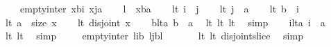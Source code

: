 \begin{isabellebody}
\ \ \ \ empty{\isacharunderscore}inter\ {\isacharparenleft}x{\isasymdagger}b{\isachardot}{\isachardot}i{\isacharparenright}\ {\isacharparenleft}x{\isasymdagger}j{\isachardot}{\isachardot}a{\isacharparenright}{\isachardoublequoteclose}\isanewline
%
\isadelimproof
%
\endisadelimproof
%
\isatagproof
{}\isamarkupfalse%
{\isacharminus}\isanewline
\ \ \isamarkupfalse%
\ {\isacharquery}l\ {\isacharequal}\ {\isachardoublequoteopen}x{\isasymdagger}b{\isachardot}{\isachardot}a{\isachardoublequoteclose}\isanewline
\ \ \isamarkupfalse%
\ lt{}{\isacharcolon}\ {\isachardoublequoteopen}i\ {\isasymle}\ j{\isachardoublequoteclose}\isanewline
\ \ \isamarkupfalse%
\ lt{}{\isacharcolon}\ {\isachardoublequoteopen}j\ {\isasymle}\ a{\isachardoublequoteclose}\isanewline
\ \ \isamarkupfalse%
\ lt{}{\isacharcolon}\ {\isachardoublequoteopen}b\ {\isasymle}\ i{\isachardoublequoteclose}\isanewline
\ \ \isamarkupfalse%
\ lt{}{\isacharcolon}\ {\isachardoublequoteopen}a\ {\isasymle}\ size\ x{\isachardoublequoteclose}\isanewline
\ \ \isamarkupfalse%
\ lt{}{\isacharcolon}\ {\isachardoublequoteopen}disjoint\ x{\isachardoublequoteclose}\isanewline
\ \ \isamarkupfalse%
\ blta{\isacharcolon}\ {\isachardoublequoteopen}b\ {\isasymle}\ a{\isachardoublequoteclose}\ \isamarkupfalse%
\ lt{}\ lt{}\ lt{}\ \isamarkupfalse%
\ simp\isanewline
\ \ \isamarkupfalse%
\ ilta{\isacharcolon}\ {\isachardoublequoteopen}i\ {\isasymle}\ a{\isachardoublequoteclose}\ \isamarkupfalse%
\ lt{}\ lt{}\ \isamarkupfalse%
\ simp\isanewline
\ \ \isamarkupfalse%
\ {}{\isacharcolon}\ {\isachardoublequoteopen}empty{\isacharunderscore}inter\ {\isacharparenleft}{\isacharquery}l{\isasymdagger}{}{\isachardot}{\isachardot}{\isacharparenleft}i{\isacharminus}b{\isacharparenright}{\isacharparenright}\ {\isacharparenleft}{\isacharquery}l{\isasymdagger}{\isacharparenleft}j{\isacharminus}b{\isacharparenright}{\isachardot}{\isachardot}{\isacharparenleft}{\isacharhash}{\isacharquery}l{\isacharparenright}{\isacharparenright}{\isachardoublequoteclose}\ \isanewline
\ \ \ \ \isamarkupfalse%
\ lt{}\ lt{}\ disjoint{\isacharunderscore}slice\ \isamarkupfalse%
\ simp\isanewline
\ \ \isamarkupfalse%

\end{isabellebody}
